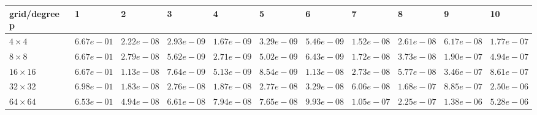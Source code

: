 \begin{tabular}{lllllllllll}
\hline
 grid/degree p   & 1          & 2          & 3          & 4          & 5          & 6          & 7          & 8          & 9          & 10         \\
\hline
 $4 \times 4$    & $6.67e-01$ & $2.22e-08$ & $2.93e-09$ & $1.67e-09$ & $3.29e-09$ & $5.46e-09$ & $1.52e-08$ & $2.61e-08$ & $6.17e-08$ & $1.77e-07$ \\
 $8 \times 8$    & $6.67e-01$ & $2.79e-08$ & $5.62e-09$ & $2.71e-09$ & $5.02e-09$ & $6.43e-09$ & $1.72e-08$ & $3.73e-08$ & $1.90e-07$ & $4.94e-07$ \\
 $16 \times 16$  & $6.67e-01$ & $1.13e-08$ & $7.64e-09$ & $5.13e-09$ & $8.54e-09$ & $1.13e-08$ & $2.73e-08$ & $5.77e-08$ & $3.46e-07$ & $8.61e-07$ \\
 $32 \times 32$  & $6.98e-01$ & $1.83e-08$ & $2.76e-08$ & $1.87e-08$ & $2.77e-08$ & $3.29e-08$ & $6.06e-08$ & $1.68e-07$ & $8.85e-07$ & $2.50e-06$ \\
 $64 \times 64$  & $6.53e-01$ & $4.94e-08$ & $6.61e-08$ & $7.94e-08$ & $7.65e-08$ & $9.93e-08$ & $1.05e-07$ & $2.25e-07$ & $1.38e-06$ & $5.28e-06$ \\
\hline
\end{tabular}
